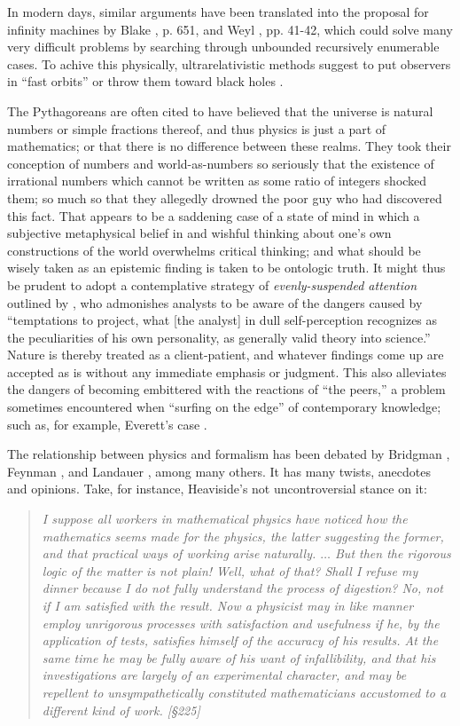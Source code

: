 In modern days, similar arguments have been translated into the proposal for
infinity machines  by
Blake \cite{Blake26}, p. 651,
and Weyl \cite{weyl:49}, pp. 41-42,
which could solve many very difficult problems by searching through unbounded recursively enumerable cases.
To achive this physically, ultrarelativistic methods suggest to put observers in ``fast orbits'' or throw them toward
black holes \cite{pit:90}.


The Pythagoreans are often cited to have believed that the universe is natural numbers or simple fractions thereof, and thus physics is just a part of mathematics; or that
there is no difference between these realms.
They took their conception of numbers and world-as-numbers so seriously that the existence of irrational numbers which cannot
be written as some ratio of integers shocked them; so much so that they allegedly drowned the poor guy who had discovered this fact.
That appears to be a saddening case of a state of mind in which a subjective metaphysical belief in and
wishful thinking about one's own constructions of the world overwhelms critical thinking;
and what should be wisely taken as an epistemic finding is taken to be ontologic truth.
It might thus be prudent to
adopt a contemplative strategy of {\em evenly-suspended attention}
outlined by  \cite{Freud-1912}, who admonishes analysts to be aware of the dangers
caused by {``temptations to project,
what  [the analyst]  in dull self-perception recognizes as the peculiarities of his own personality,
as generally valid theory into science.''}
Nature is thereby treated as a  client-patient,  and whatever findings come up are accepted  as is  without any
immediate emphasis or judgment.
This also alleviates the dangers of becoming embittered with the reactions of ``the peers,''
a problem sometimes encountered when ``surfing on the edge'' of contemporary knowledge; such as, for
example, Everett's case \cite{everett-collw}.

The relationship between physics and formalism has been debated by
Bridgman \cite{bridgman},
Feynman \cite{feynman-computation},
and  Landauer \cite{landauer},
among many others.
It has many twists, anecdotes and opinions.
Take, for instance, Heaviside's not uncontroversial stance \cite{heaviside-EMT} on it:
\begin{quote}
{\em
I suppose all workers
in mathematical physics have noticed how the mathematics
seems made for the physics, the latter suggesting the former, and
that practical ways of working arise naturally. $\ldots$ But then the
rigorous logic of the matter is not plain! Well, what of that?
Shall I refuse my dinner because I do not fully understand the
process of digestion? No, not if I am satisfied with the result.
Now a physicist may in like manner employ unrigorous processes with satisfaction and usefulness if he, by the application
of tests, satisfies himself of the accuracy of his results. At
the same time he may be fully aware of his want of infallibility,
and that his investigations are largely of an experimental character, and may be repellent to unsympathetically
constituted mathematicians accustomed to a different kind
of work.  [\S 225]
}
\end{quote}

